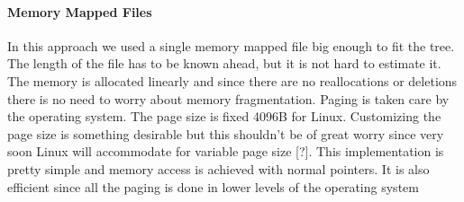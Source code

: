 \documentclass[12pt,letterpaper,doublespaced,ETD,dvips,proposal]{gtthesis}
\begin{document}
\begin{Body}
\paragraph{Memory Mapped Files} In this approach we used a single memory
mapped file big enough to fit the tree. The length of the file has
to be known ahead, but it is not hard to estimate it. The memory is
allocated linearly and since there are no reallocations or deletions
there is no need to worry about memory fragmentation. Paging is
taken care by the operating system. The page size is fixed 4096B for
Linux. Customizing the page size is something desirable but this
shouldn't be of great worry since very soon Linux will accommodate
for variable page size [?]. This implementation is pretty simple and
memory access is achieved with normal pointers. It is also efficient
since all the paging is done in lower levels of the operating system


\end{Body}
\end{document}
